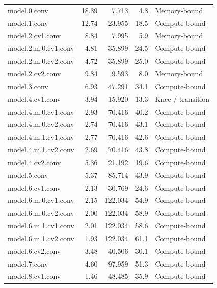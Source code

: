\documentclass[12pt,a4paper]{report}
\begin{document}
\begin{longtable}{p{} r r r p{}}
model.0.conv                         & 18.39 & 7.713   & 4.8  & Memory-bound \\
model.1.conv                         & 12.74 & 23.955  & 18.5 & Compute-bound \\
model.2.cv1.conv                     & 8.84  & 7.995   & 5.9  & Memory-bound \\
model.2.m.0.cv1.conv                 & 4.81  & 35.899  & 24.5 & Compute-bound \\
model.2.m.0.cv2.conv                 & 4.72  & 35.899  & 25.0 & Compute-bound \\
model.2.cv2.conv                     & 9.84  & 9.593   & 8.0  & Memory-bound \\
model.3.conv                         & 6.93  & 47.291  & 34.1 & Compute-bound \\
model.4.cv1.conv                     & 3.94  & 15.920  & 13.3 & Knee / transition \\
model.4.m.0.cv1.conv                 & 2.93  & 70.416  & 40.2 & Compute-bound \\
model.4.m.0.cv2.conv                 & 2.74  & 70.416  & 43.1 & Compute-bound \\
model.4.m.1.cv1.conv                 & 2.77  & 70.416  & 42.6 & Compute-bound \\
model.4.m.1.cv2.conv                 & 2.69  & 70.416  & 43.8 & Compute-bound \\
model.4.cv2.conv                     & 5.36  & 21.192  & 19.6 & Compute-bound \\
model.5.conv                         & 5.37  & 85.714  & 43.9 & Compute-bound \\
model.6.cv1.conv                     & 2.13  & 30.769  & 24.6 & Compute-bound \\
model.6.m.0.cv1.conv                 & 2.15  & 122.034 & 54.9 & Compute-bound \\
model.6.m.0.cv2.conv                 & 2.00  & 122.034 & 58.9 & Compute-bound \\
model.6.m.1.cv1.conv                 & 2.01  & 122.034 & 58.6 & Compute-bound \\
model.6.m.1.cv2.conv                 & 1.93  & 122.034 & 61.1 & Compute-bound \\
model.6.cv2.conv                     & 3.48  & 40.506  & 30.1 & Compute-bound \\
model.7.conv                         & 4.60  & 97.959  & 51.3 & Compute-bound \\
model.8.cv1.conv                     & 1.46  & 48.485  & 35.9 & Compute-bound \\

\end{longtable}
\end{document}
